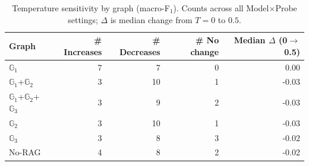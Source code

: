 \begin{table}[t]
\centering
\scriptsize
\caption{Temperature sensitivity by graph (macro-F$_1$). Counts across all Model$\times$Probe settings; $\Delta$ is median change from $T{=}0$ to $0.5$.}
\begin{tabular}{lrrrr}
\hline
Graph & \# Increases & \# Decreases & \# No change & Median $\Delta$ (0$\to$0.5) \\
\hline
$\mathbb{G}_1$         & 7  & 7  & 0 &  0.00 \\
$\mathbb{G}_1$+$\mathbb{G}_2$      & 3  & 10 & 1 & -0.03 \\
$\mathbb{G}_1$+$\mathbb{G}_2$+$\mathbb{G}_3$   & 3  & 9  & 2 & -0.03 \\
$\mathbb{G}_2$         & 3  & 10 & 1 & -0.03 \\
$\mathbb{G}_3$         & 3  & 8  & 3 & -0.02 \\
No-RAG     & 4  & 8  & 2 & -0.02 \\
\hline
\end{tabular}
\label{tab:temp-by-graph}
\end{table}



